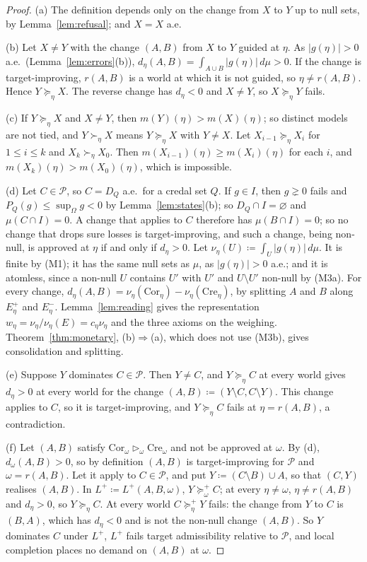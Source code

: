 \documentclass[11pt]{article}
\theoremstyle{definition}
\newcommand{\Pc}{\mathcal P}
\newcommand{\Cor}{\mathrm{Cor}}
\newcommand{\Cre}{\mathrm{Cre}}
\newcommand{\Ep}{E^{+}}
\newcommand{\Em}{E^{-}}
\newcommand{\sgt}{\triangleright}
\begin{document}
\begin{proof}
(a) The definition depends only on the change from $X$ to $Y$ up to null sets, by Lemma~\ref{lem:refusal}; and $X=X$ a.e.

(b) Let $X\ne Y$ with the change $(A,B)$ from $X$ to $Y$ guided at $\eta$. As $|g(\eta)|>0$ a.e.\ (Lemma~\ref{lem:errors}(b)), $d_\eta(A,B)=\int_{A\cup B}|g(\eta)|\,d\mu>0$. If the change is target-improving, $r(A,B)$ is a world at which it is not guided, so $\eta\ne r(A,B)$. Hence $Y\succeq_\eta X$. The reverse change has $d_\eta<0$ and $X\ne Y$, so $X\succeq_\eta Y$ fails.

(c) If $Y\succeq_\eta X$ and $X\ne Y$, then $m(Y)(\eta)>m(X)(\eta)$; so distinct models are not tied, and $Y\succ_\eta X$ means $Y\succeq_\eta X$ with $Y\ne X$. Let $X_{i-1}\succeq_\eta X_i$ for $1\le i\le k$ and $X_k\succ_\eta X_0$. Then $m(X_{i-1})(\eta)\ge m(X_i)(\eta)$ for each $i$, and $m(X_k)(\eta)>m(X_0)(\eta)$, which is impossible.

(d) Let $C\in\Pc$, so $C=D_Q$ a.e.\ for a credal set $Q$. If $g\in I$, then $g\gneq0$ fails and $P_Q(g)\le\sup_\Omega g<0$ by Lemma~\ref{lem:states}(b); so $D_Q\cap I=\varnothing$ and $\mu(C\cap I)=0$. A change that applies to $C$ therefore has $\mu(B\cap I)=0$; so no change that drops sure losses is target-improving, and such a change, being non-null, is approved at $\eta$ if and only if $d_\eta>0$. Let $\nu_\eta(U)\coloneqq\int_U|g(\eta)|\,d\mu$. It is finite by (M1); it has the same null sets as $\mu$, as $|g(\eta)|>0$ a.e.; and it is atomless, since a non-null $U$ contains $U'$ with $U'$ and $U\setminus U'$ non-null by (M3a). For every change, $d_\eta(A,B)=\nu_\eta(\Cor_\eta)-\nu_\eta(\Cre_\eta)$, by splitting $A$ and $B$ along $\Ep_\eta$ and $\Em_\eta$. Lemma~\ref{lem:reading} gives the representation $w_\eta=\nu_\eta/\nu_\eta(E)=c_\eta\nu_\eta$ and the three axioms on the weighing. Theorem~\ref{thm:monetary}, (b)$\Rightarrow$(a), which does not use (M3b), gives consolidation and splitting.

(e) Suppose $Y$ dominates $C\in\Pc$. Then $Y\ne C$, and $Y\succeq_\eta C$ at every world gives $d_\eta>0$ at every world for the change $(A,B)\coloneqq(Y\setminus C,C\setminus Y)$. This change applies to $C$, so it is target-improving, and $Y\succeq_\eta C$ fails at $\eta=r(A,B)$, a contradiction.

(f) Let $(A,B)$ satisfy $\Cor_\omega\sgt_\omega\Cre_\omega$ and not be approved at $\omega$. By (d), $d_\omega(A,B)>0$, so by definition $(A,B)$ is target-improving for $\Pc$ and $\omega=r(A,B)$. Let it apply to $C\in\Pc$, and put $Y\coloneqq(C\setminus B)\cup A$, so that $(C,Y)$ realises $(A,B)$. In $L^+\coloneqq L^+(A,B,\omega)$, $Y\succeq^+_\omega C$; at every $\eta\ne\omega$, $\eta\ne r(A,B)$ and $d_\eta>0$, so $Y\succeq_\eta C$. At every world $C\succeq^+_\eta Y$ fails: the change from $Y$ to $C$ is $(B,A)$, which has $d_\eta<0$ and is not the non-null change $(A,B)$. So $Y$ dominates $C$ under $L^+$, $L^+$ fails target admissibility relative to $\Pc$, and local completion places no demand on $(A,B)$ at $\omega$.
\end{proof}
\end{document}
